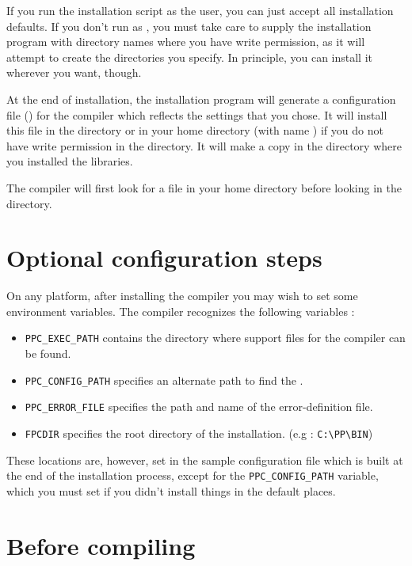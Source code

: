 If you run the installation script as the  user, you can just accept all installation
defaults. If you don't run as , you must take care to supply the
installation program with directory names where you have write permission,
as it will attempt to create the directories you specify.
In principle, you can install it wherever you want, though.

At the end of installation, the installation program will generate a
configuration file () for the \fpc compiler which
reflects the settings that you chose. It will install this file in
the  directory or in your home directory (with name
) if you do not have write permission in the 
directory. It will make a copy in the directory where you installed the
libraries.

The compiler will first look for a file  in your home
directory before looking in the  directory.

\section{Optional configuration steps}
On any platform, after installing the compiler you may wish to set
some environment variables. The \fpc compiler recognizes the
following variables :

\begin{itemize}
\item \verb|PPC_EXEC_PATH| contains the directory where support files for
the compiler can be found.
\item \verb|PPC_CONFIG_PATH| specifies an alternate path to find the .
\item \verb|PPC_ERROR_FILE|  specifies the path and name of the error-definition file.
\item \verb|FPCDIR| specifies the root directory of the \fpc installation.
(e.g : \verb|C:\PP\BIN|)
\end{itemize}

These locations are, however, set in the sample configuration file which is
built at the end of the installation process, except for the
\verb|PPC_CONFIG_PATH| variable, which you must set if you didn't install
things in the default places.

\section{Before compiling}

